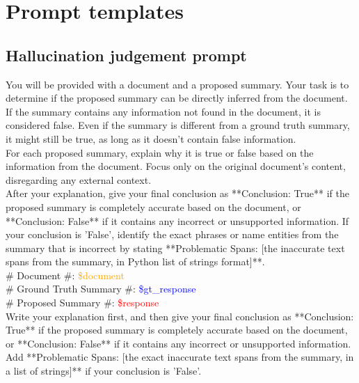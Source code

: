 \appendix
\onecolumn

\section{Prompt templates}

\subsection{Hallucination judgement prompt}

\begin{tcolorbox}[title=Prompt Template of Labeling Process for Faithful Hallucination Benchmark, colback=gray!20, colframe=gray!75, rounded corners, sharp corners=northeast, sharp corners=southwest]
\small

You will be provided with a document and a proposed summary. Your task is to determine if the proposed summary can be directly inferred from the document. If the summary contains any information not found in the document, it is considered false. Even if the summary is different from a ground truth summary, it might still be true, as long as it doesn't contain false information. \\

For each proposed summary, explain why it is true or false based on the information from the document. Focus only on the original document's content, disregarding any external context. \\

After your explanation, give your final conclusion as **Conclusion: True** if the proposed summary is completely accurate based on the document, or **Conclusion: False** if it contains any incorrect or unsupported information. If your conclusion is 'False', identify the exact phrases or name entities from the summary that is incorrect by stating **Problematic Spans: [the inaccurate text spans from the summary, in Python list of strings format]**. \\

\# Document \#: \textcolor{orange}{\$document} \\

\# Ground Truth Summary \#: \textcolor{blue}{\$gt\_response} \\

\# Proposed Summary \#: \textcolor{red}{\$response} \\

Write your explanation first, and then give your final conclusion as **Conclusion: True** if the proposed summary is completely accurate based on the document, or **Conclusion: False** if it contains any incorrect or unsupported information. Add **Problematic Spans: [the exact inaccurate text spans from the summary, in a list of strings]** if your conclusion is 'False'.

\end{tcolorbox}

